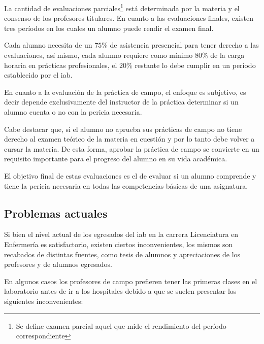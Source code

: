 La cantidad de evaluaciones parciales\footnote{Se
    define examen parcial aquel que mide el rendimiento del período
    correspondiente\cite{iab:est_enfemeria}} está determinada por la materia y el
consenso de los profesores titulares\cite{iab:est_enfemeria}. En cuanto a las 
evaluaciones finales, existen tres períodos en los cuales un alumno puede rendir 
el examen final.


Cada alumno necesita de un $75\%$ de asistencia presencial para tener derecho a
las evaluaciones, así mismo, cada alumno requiere como mínimo $80\%$ de la carga
horaria en prácticas profesionales, el $20\%$ restante lo debe cumplir en un
periodo establecido por el \Gls{iab}.

En cuanto a la evaluación de la práctica de campo, el enfoque es
subjetivo, es decir depende exclusivamente del instructor de la práctica
determinar si un alumno cuenta o no con la pericia necesaria.
    
Cabe destacar que, si el alumno no aprueba sus prácticas de campo no tiene 
derecho al examen teórico de la materia en cuestión y por lo tanto debe volver 
a cursar la materia. De esta forma, aprobar la práctica de campo se convierte 
en un requisito importante para el progreso del alumno en su vida académica.

El objetivo final de estas evaluaciones es el de evaluar si un alumno comprende
y tiene la pericia necesaria en todas las competencias básicas de una
asignatura.



\subsection{Problemas actuales}
\label{sec:problemas_actuales}

Si bien el nivel actual de los egresados del \Gls{iab} en la carrera
Licenciatura en Enfermería es satisfactorio, existen ciertos inconvenientes, los
mismos son recabados de distintas fuentes, como tesis de
alumnos\cite{iab:tesis_atencion,iab:tesis_alumnos} y apreciaciones de los
profesores y de alumnos egresados.

En algunos casos los profesores de campo prefieren tener las primeras clases en
el laboratorio antes de ir a los hospitales debido a que se suelen presentar los
siguientes inconvenientes:

